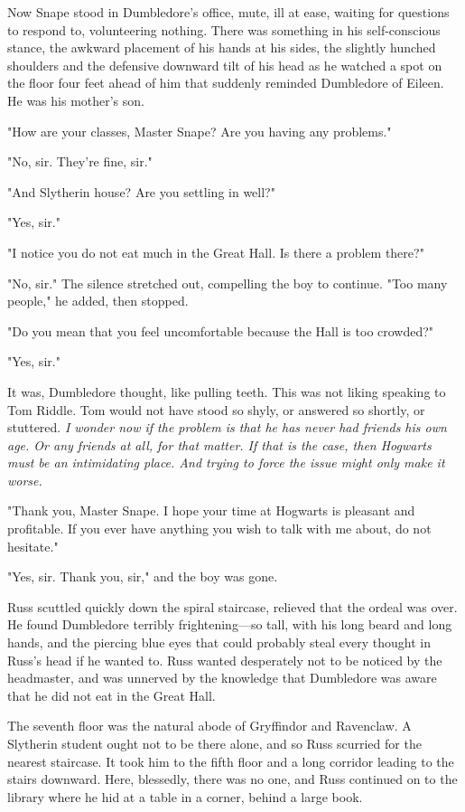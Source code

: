 Now Snape stood in Dumbledore's office, mute, ill at ease, waiting for questions to respond to, volunteering nothing. There was something in his self-conscious stance, the awkward placement of his hands at his sides, the slightly hunched shoulders and the defensive downward tilt of his head as he watched a spot on the floor four feet ahead of him that suddenly reminded Dumbledore of Eileen. He was his mother's son.

"How are your classes, Master Snape? Are you having any problems."

"No, sir. They're{\el} fine, sir."

"And Slytherin house? Are you settling in well?"

"Yes, sir."

"I notice you do not eat much in the Great Hall. Is there a problem there?"

"No, sir." The silence stretched out, compelling the boy to continue. "Too{\el} many people," he added, then stopped.

"Do you mean that you feel uncomfortable because the Hall is too crowded?"

"Yes, sir."

It was, Dumbledore thought, like pulling teeth. This was not liking speaking to Tom Riddle. Tom would not have stood so shyly, or answered so shortly, or stuttered. \emph{I wonder now if the problem is that he has never had friends his own age. Or any friends at all, for that matter. If that is the case, then Hogwarts must be an intimidating place. And trying to force the issue might only make it worse.}

"Thank you, Master Snape. I hope your time at Hogwarts is pleasant and profitable. If you ever have anything you wish to talk with me about, do not hesitate."

"Yes, sir. Thank{\el} you, sir," and the boy was gone.

Russ scuttled quickly down the spiral staircase, relieved that the ordeal was over. He found Dumbledore terribly frightening—so tall, with his long beard and long hands, and the piercing blue eyes that could probably steal every thought in Russ's head if he wanted to. Russ wanted desperately not to be noticed by the headmaster, and was unnerved by the knowledge that Dumbledore was aware that he did not eat in the Great Hall.

The seventh floor was the natural abode of Gryffindor and Ravenclaw. A Slytherin student ought not to be there alone, and so Russ scurried for the nearest staircase. It took him to the fifth floor and a long corridor leading to the stairs downward. Here, blessedly, there was no one, and Russ continued on to the library where he hid at a table in a corner, behind a large book.

